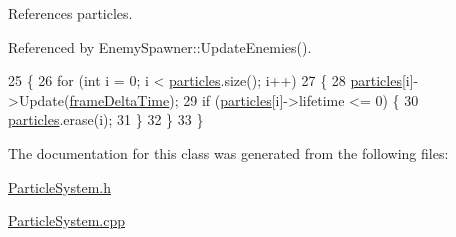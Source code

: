 References particles.



Referenced by Enemy\-Spawner\-::\-Update\-Enemies().


\begin{DoxyCode}
25 \{
26     \textcolor{keywordflow}{for} (\textcolor{keywordtype}{int} i = 0; i < \hyperlink{_particle_system_8cpp_afa9585a41fcc4d82bbbeb34189aca376}{particles}.size(); i++)
27     \{
28         \hyperlink{_particle_system_8cpp_afa9585a41fcc4d82bbbeb34189aca376}{particles}[i]->Update(\hyperlink{_player_8cpp_adc988571147642cda93afbf89783f9c9}{frameDeltaTime});
29         \textcolor{keywordflow}{if} (\hyperlink{_particle_system_8cpp_afa9585a41fcc4d82bbbeb34189aca376}{particles}[i]->lifetime <= 0) \{
30             \hyperlink{_particle_system_8cpp_afa9585a41fcc4d82bbbeb34189aca376}{particles}.erase(i);
31         \}
32     \}
33 \}
\end{DoxyCode}


The documentation for this class was generated from the following files\-:\begin{DoxyCompactItemize}
\item 
\hyperlink{_particle_system_8h}{Particle\-System.\-h}\item 
\hyperlink{_particle_system_8cpp}{Particle\-System.\-cpp}\end{DoxyCompactItemize}
